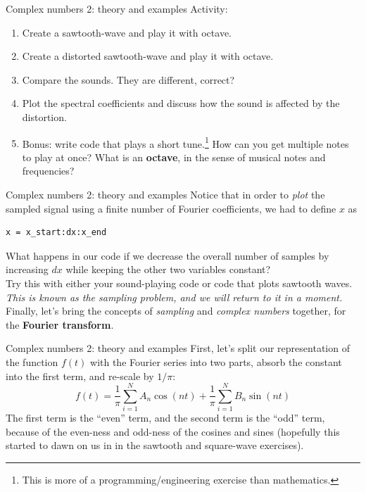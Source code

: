 \documentclass{beamer}
\begin{document}
\begin{frame}[fragile]{Complex numbers 2: theory and examples}
Activity:
\begin{enumerate}
\item Create a sawtooth-wave and play it with octave.
\item Create a distorted sawtooth-wave and play it with octave.
\item Compare the sounds.  They are different, correct?
\item Plot the spectral coefficients and discuss how the sound is affected by the distortion.
\item \alert{Bonus: write code that plays a short tune.}\footnote{This is more of a programming/engineering exercise than mathematics.}  How can you get multiple notes to play at once?  What is an \textbf{octave}, in the sense of musical notes and frequencies?
\end{enumerate}
\end{frame}

\begin{frame}[fragile]{Complex numbers 2: theory and examples}
\small
Notice that in order to \textit{plot} the sampled signal using a finite number of Fourier coefficients, we had to define $x$ as 
\begin{verbatim}
x = x_start:dx:x_end
\end{verbatim}
What happens in our code if we decrease the overall number of samples by increasing $dx$ while keeping the other two variables constant? \\ \vspace{0.5cm}
Try this with either your sound-playing code or code that plots sawtooth waves.  \textit{This is known as the sampling problem, and we will return to it in a moment.} \\ \vspace{0.5cm}
Finally, let's bring the concepts of \textit{sampling} and \textit{complex numbers} together, for the \textbf{\alert{Fourier transform}}.
\end{frame}

\begin{frame}[fragile]{Complex numbers 2: theory and examples}
First, let's split our representation of the function $f(t)$ with the Fourier series into two parts, absorb the constant into the first term, and re-scale by $1/\pi$:
\begin{equation}
f(t) = \frac{1}{\pi}\sum_{i=1}^N A_n \cos(nt) + \frac{1}{\pi}\sum_{i=1}^N B_n \sin(nt)
\end{equation}
The first term is the ``even'' term, and the second term is the ``odd'' term, because of the even-ness and odd-ness of the cosines and sines (hopefully this started to dawn on us in in the sawtooth and square-wave exercises).
\end{frame}
\end{document}
